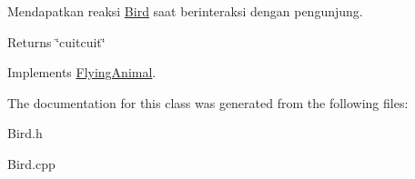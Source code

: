 Mendapatkan reaksi \hyperlink{classBird}{Bird} saat berinteraksi dengan pengunjung. 

\begin{DoxyReturn}{Returns}
\char`\"{}cuitcuit\char`\"{} 
\end{DoxyReturn}


Implements \hyperlink{classFlyingAnimal_ac0eee625fa2235eee8cbdc0a010ae430}{Flying\-Animal}.



The documentation for this class was generated from the following files\-:\begin{DoxyCompactItemize}
\item 
Bird.\-h\item 
Bird.\-cpp\end{DoxyCompactItemize}
